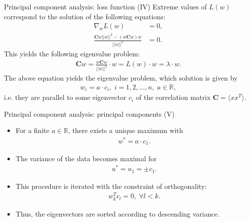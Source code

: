 \documentclass[aspectratio=169,t]{beamer}
\begin{document}
  {
    \begin{frame}{Principal component analysis: loss function (IV)}
    Extreme values of $L(w)$ correspond to the solution of the following equations:
    \begin{align}
    \nabla_w L(w) &= 0,\\
    \frac{\mathbf{C}w \vert\vert w \vert\vert^2 - (w \mathbf{C} w)w}{\vert\vert w \vert\vert^4} &= 0.
    \end{align}
    This yields the following eigenvalue problem:
    \begin{align}
      \mathbf{C}w = \frac{w\mathbf{C}w}{\vert\vert w \vert\vert^2} \cdot w = L(w) \cdot w = \lambda \cdot w.
    \end{align}
    The above equation yields the eigenvalue problem, which solution is given by
    \begin{align}
    w_i = a \cdot c_i, \; i=1,2,\ldots,n, \; a \in \mathbb{R},
    \end{align}
    i.e. they are parallel to some eigenvector $c_i$ of the correlation matrix $\mathbf{C} = \langle xx^T \rangle$.
    \end{frame}
  }

  {
    \begin{frame}{Principal component analysis: principal components (V)}
    \begin{itemize}
      \item For a finite $a \in \mathbb{R}$, there exists a unique maximum with 
      \begin{align}
      w^* = a \cdot c_1.
      \end{align}
      \item The variance of the data becomes maximal for 
      \begin{align}
      u^* = u_1 = \pm c_1.
      \end{align}
      \item This procedure is iterated with the constraint of orthogonality: 
      \begin{align}
      w_k^Tc_l = 0, \; \forall l < k.
      \end{align}
      \item Thus, the eigenvectors are sorted according to descending variance.
    \end{itemize}
    \end{frame}
  }
\end{document}
